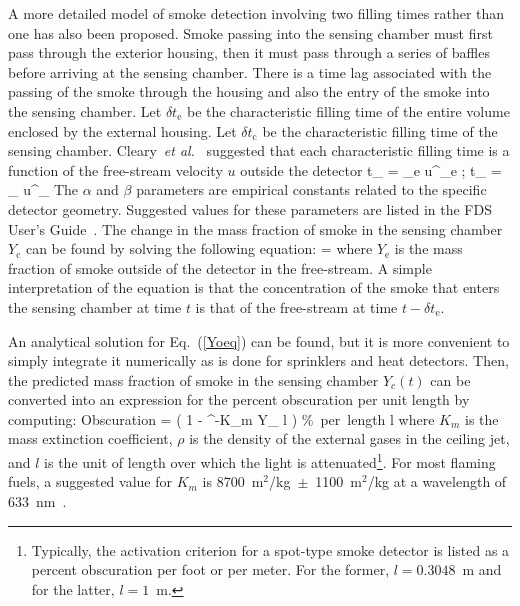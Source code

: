 A more detailed model of smoke detection involving two filling times rather than one has also been proposed. Smoke passing into the sensing chamber must first pass through the exterior housing, then it must pass through a series of baffles before arriving at the sensing chamber. There is a time lag associated with the passing of the smoke through the housing and also the entry of the smoke into the sensing chamber.
Let $\delta t_\mathrm{e}$ be the characteristic filling time of the entire volume enclosed by the external housing. Let $\delta t_\mathrm{c}$ be the characteristic filling time of the sensing chamber. Cleary~{\em et al.}~\cite{Cleary:IAFSS6} suggested that each characteristic filling time is a function of the free-stream velocity $u$ outside the detector
\be
\delta t_ = \alpha_e u^{\beta_e} \quad ; \quad \delta t_ = \alpha_ u^{\beta_}
\ee
The $\alpha$ and $\beta$ parameters are empirical constants related to the specific detector geometry. Suggested values for these parameters are listed in the FDS User's Guide~\cite{FDS_Users_Guide}. The change in the mass fraction of smoke in the sensing chamber $Y_\mathrm{c}$ can be found by solving the following equation:
\be
{} =  \label{Yoeq}
\ee
where $Y_\mathrm{e}$ is the mass fraction of smoke outside of the detector in the free-stream. A simple interpretation of the equation is that the concentration of the smoke that enters the sensing chamber at time $t$ is that of the free-stream at time $t-\delta t_\mathrm{e}$.

An analytical solution for Eq.~(\ref{Yoeq}) can be found, but it is more convenient to simply integrate it numerically as is done for sprinklers and heat detectors. Then, the predicted mass fraction of smoke in the sensing chamber $Y_c(t)$ can be converted into an expression for the percent obscuration per unit length by computing:
\be
   \hbox{Obscuration}  = \left( 1 - ^{-K_m \rho Y_ l} \right)  \; \; \hbox{\% per length} \; l
\ee
where $K_m$ is the mass extinction coefficient, $\rho$ is the density of the external gases in the ceiling jet, and $l$ is the unit of length over which the light is attenuated\footnote{Typically, the activation criterion for a spot-type smoke detector is listed as a percent obscuration per foot or per meter. For the former, $l=0.3048$~m and for the latter, $l=1$~m.}. For most flaming fuels, a suggested value for $K_m$ is 8700~m$^2$/kg~$\pm$~1100~m$^2$/kg at a wavelength of 633~nm~\cite{Mulholland:F+M}.

